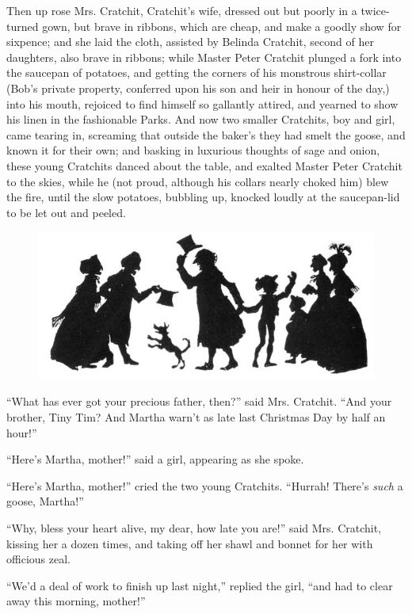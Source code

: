 \documentclass[paper=5.5in:8.5in,BCOR=15mm,twoside,DIV=15,headinclude=off,12pt,chapterprefix=off,openany,headings=huge]{scrbook} %
\begin{document}
Then up rose Mrs. Cratchit, Cratchit's wife, dressed out but poorly in a twice-turned gown, but brave in ribbons, which are cheap, and make a goodly show for sixpence; and she laid the cloth, assisted by Belinda Cratchit, second of her daughters, also brave in ribbons; while Master Peter Cratchit plunged a fork into the saucepan of potatoes, and getting the corners of his monstrous shirt-collar (Bob's private property, conferred upon his son and heir in honour of the day,) into his mouth, rejoiced to find himself so gallantly attired, and yearned to show his linen in the fashionable Parks. And now two smaller Cratchits, boy and girl, came tearing in, screaming that outside the baker's they had smelt the goose, and known it for their own; and basking in luxurious thoughts of sage and onion, these young Cratchits danced about the table, and exalted Master Peter Cratchit to the skies, while he (not proud, although his collars nearly choked him) blew the fire, until the slow potatoes, bubbling up, knocked loudly at the saucepan-lid to be let out and peeled.
\cleardoubleevenemptypage
\begin{figure}
\centering
\includegraphics[width=\linewidth]{gs109}
\end{figure}

\enquote{What has ever got your precious father, then?} said Mrs. Cratchit. \enquote{And your brother, Tiny Tim? And Martha warn't as late last Christmas Day by half an hour!}

\enquote{Here's Martha, mother!} said a girl, appearing as she spoke.

\enquote{Here's Martha, mother!} cried the two young Cratchits. \enquote{Hurrah! There's \textit{such} a goose, Martha!}

\enquote{Why, bless your heart alive, my dear, how late you are!} said Mrs. Cratchit, kissing her a dozen times, and taking off her shawl and bonnet for her with officious zeal.

\enquote{We'd a deal of work to finish up last night,} replied the girl, \enquote{and had to clear away this morning, mother!}
\end{document}
